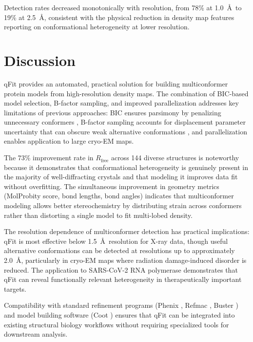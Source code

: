 \documentclass[11pt]{article}
\begin{document}
Detection rates decreased monotonically with resolution, from 78\% at 1.0~\AA\ to 19\% at 2.5~\AA, consistent with the physical reduction in density map features reporting on conformational heterogeneity at lower resolution.

\section{Discussion}

qFit provides an automated, practical solution for building multiconformer protein models from high-resolution density maps. The combination of BIC-based model selection, B-factor sampling, and improved parallelization addresses key limitations of previous approaches: BIC ensures parsimony by penalizing unnecessary conformers \citep{bic_schwarz1978}, B-factor sampling accounts for displacement parameter uncertainty that can obscure weak alternative conformations \citep{bfactor_crystallography2003}, and parallelization enables application to large cryo-EM maps.

The 73\% improvement rate in $R_{\text{free}}$ across 144 diverse structures is noteworthy because it demonstrates that conformational heterogeneity is genuinely present in the majority of well-diffracting crystals and that modeling it improves data fit without overfitting. The simultaneous improvement in geometry metrics (MolProbity score, bond lengths, bond angles) indicates that multiconformer modeling allows better stereochemistry by distributing strain across conformers rather than distorting a single model to fit multi-lobed density.

The resolution dependence of multiconformer detection has practical implications: qFit is most effective below 1.5~\AA\ resolution for X-ray data, though useful alternative conformations can be detected at resolutions up to approximately 2.0~\AA, particularly in cryo-EM maps where radiation damage-induced disorder is reduced. The application to SARS-CoV-2 RNA polymerase demonstrates that qFit can reveal functionally relevant heterogeneity in therapeutically important targets.

Compatibility with standard refinement programs (Phenix \citep{phenix_liebschner2019}, Refmac \citep{murshudov2011refmac5}, Buster \citep{buster_smart2012}) and model building software (Coot \citep{emsley2010features}) ensures that qFit can be integrated into existing structural biology workflows without requiring specialized tools for downstream analysis.
\end{document}
